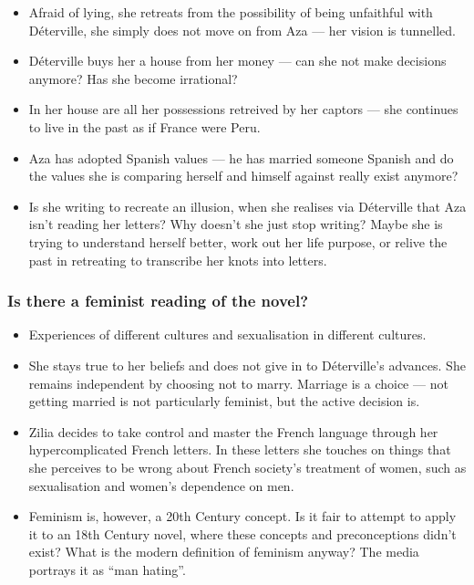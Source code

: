 \documentclass[12pt]{article}
\begin{document}
\begin{itemize}
  \item{Afraid of lying, she retreats from the possibility of being unfaithful with Déterville, she simply does not move on from Aza --- her vision is tunnelled.}
  \item{Déterville buys her a house from her money --- can she not make decisions anymore? Has she become irrational?}
  \item{In her house are all her possessions retreived by her captors --- she continues to live in the past as if France were Peru.}
  \item{Aza has adopted Spanish values --- he has married someone Spanish and do the values she is comparing herself and himself against really exist anymore?}
  \item{Is she writing to recreate an illusion, when she realises via Déterville that Aza isn't reading her letters? Why doesn't she just stop writing? Maybe she is trying to understand herself better, work out her life purpose, or relive the past in retreating to transcribe her knots into letters.}
\end{itemize}

\subsubsection*{Is there a feminist reading of the novel?}

\begin{itemize}
  \item{Experiences of different cultures and sexualisation in different cultures.}
  \item{She stays true to her beliefs and does not give in to Déterville's advances. She remains independent by choosing not to marry. Marriage is a choice --- not getting married is not particularly feminist, but the active decision is.}
  \item{Zilia decides to take control and master the French language through her hypercomplicated French letters. In these letters she touches on things that she perceives to be wrong about French society's treatment of women, such as sexualisation and women's dependence on men.}
  \item{Feminism is, however, a 20th Century concept. Is it fair to attempt to apply it to an 18th Century novel, where these concepts and preconceptions didn't exist? What is the modern definition of feminism anyway? The media portrays it as ``man hating''.}
\end{itemize}
\end{document}
